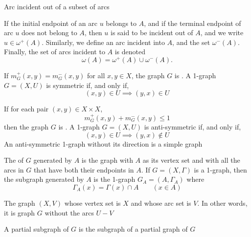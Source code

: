 \documentclass[aspectratio=43]{beamer}
\begin{document}
\begin{frame}{Arc incident out of a subset of arcs}
	\begin{definition}
		If the initial endpoint of an arc $u$ belongs to $A$, and if the terminal endpoint of arc $u$ does not belong to $A$, then $u$ is said to be incident out of $A$, and we write $u\in\omega^+(A)$.
		Similarly, we define an arc incident into $A$, and the set $\omega^-(A)$.
		Finally, the set of arcs incident to $A$ is denoted
		\[
		\omega(A) = \omega^+(A)\cup\omega^-(A).
		\]
	\end{definition}
\end{frame}

\begin{frame}
	\begin{definition}
		If $m_G^+(x,y)=m_G^-(x,y)$ for all $x,y\in X$, the graph $G$ is
		. A 1-graph $G=(X,U)$ is symmetric if, and only if,
		\[
		(x,y)\in U\implies (y,x)\in U
		\]
	\end{definition}
	\vfill
	\begin{definition}
		If for each pair $(x,y)\in X\times X$,
		\[
		m_G^+(x,y)+m_G^-(x,y)\leq 1
		\]
		then the graph $G$ is . A 1-graph $G=(X,U)$ is anti-symmetric if, and only if,
		\[
		(x,y)\in U\implies (y,x)\not\in U
		\]
		An anti-symmetric 1-graph without its direction is a simple graph
	\end{definition}
\end{frame}

\begin{frame}
	\begin{definition}
		The  of $G$ generated by $A$ is the graph with $A$ as its vertex set and with all the arcs in $G$ that have both their endpoints in $A$. If $G=(X,\Gamma)$ is a 1-graph, then the subgraph generated by $A$ is the 1-graph $G_A=(A,\Gamma_A)$ where
		\[
		\Gamma_A(x)=\Gamma(x)\cap A\qquad (x\in A)
		\]
	\end{definition}
	\vfill
	\begin{definition}
		\label{def:partial_graph}
		The graph $(X,V)$ whose vertex set is $X$ and whose arc set is $V$. 
		In other words, it is graph $G$ without the arcs $U-V$
	\end{definition}
	\vfill
	\begin{definition}
		A partial subgraph of $G$ is the subgraph of a partial graph of $G$
	\end{definition}
\end{frame}
\end{document}
